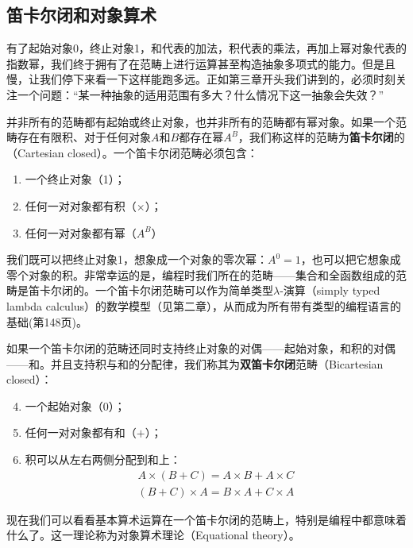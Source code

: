 \documentclass[b5paper]{ctexart}
\begin{document}
\subsection{笛卡尔闭和对象算术}

有了起始对象0，终止对象1，和代表的加法，积代表的乘法，再加上幂对象代表的指数幂，我们终于拥有了在范畴上进行运算甚至构造抽象多项式的能力。但是且慢，让我们停下来看一下这样能跑多远。正如第三章开头我们讲到的，必须时刻关注一个问题：“某一种抽象的适用范围有多大？什么情况下这一抽象会失效？”

并非所有的范畴都有起始或终止对象，也并非所有的范畴都有幂对象。如果一个范畴存在有限积、对于任何对象$A$和$B$都存在幂$A^B$，我们称这样的范畴为\textbf{笛卡尔闭}的（Cartesian closed）。一个笛卡尔闭范畴必须包含：

\begin{enumerate}
\item 一个终止对象（1）；
\item 任何一对对象都有积（$\times$）；
\item 任何一对对象都有幂（$A^B$）
\end{enumerate}

我们既可以把终止对象1，想象成一个对象的零次幂：$A^0 = 1$，也可以把它想象成零个对象的积。非常幸运的是，编程时我们所在的范畴——集合和全函数组成的范畴是笛卡尔闭的。一个笛卡尔闭范畴可以作为简单类型$\lambda$-演算（simply typed lambda calculus）的数学模型（见第二章），从而成为所有带有类型的编程语言的基础(\cite{Milewski2018}第148页)。

如果一个笛卡尔闭的范畴还同时支持终止对象的对偶——起始对象，和积的对偶——和。并且支持积与和的分配律，我们称其为\textbf{双笛卡尔闭}范畴（Bicartesian closed）：

\begin{enumerate}
  \setcounter{enumi}{3}
  \item 一个起始对象（0）；
  \item 任何一对对象都有和（$+$）；
  \item 积可以从左右两侧分配到和上：
  \[
  \begin{array}{l}
  A \times (B + C) = A \times B + A \times C \\
  (B + C) \times A = B \times A + C \times A
  \end{array}
  \]
\end{enumerate}

现在我们可以看看基本算术运算在一个笛卡尔闭的范畴上，特别是编程中都意味着什么了。这一理论称为对象算术理论（Equational theory）。
\end{document}
